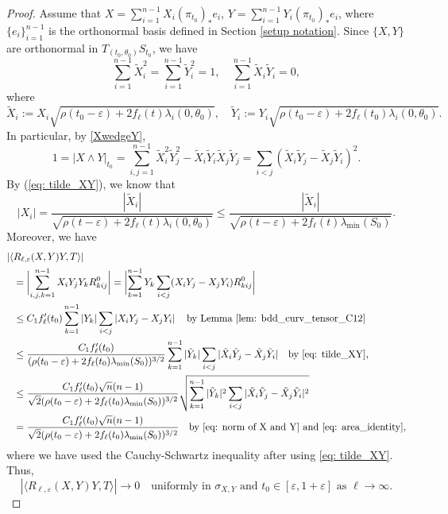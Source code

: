 \documentclass[JEP,XML,SOM,Unicode,NoFloatCountersInSection]{cedram}
\theoremstyle{definition}
\let\eps\varepsilon
\renewcommand{\>}{{\rangle}}
\newcommand{\<}{{\langle}}
\begin{document}
\begin{proof}
Assume that
$X=\sum_{i=1}^{n-1}X_i(\pi_{t_0})_*e_i$, $Y=\sum_{i=1}^{n-1}Y_i(\pi_{t_0})_*e_i$, where $\{e_i\}_{i=1}^{n-1}$ is the orthonormal basis defined in Section \ref{setup notation}. Since $\{X,Y\}$ are orthonormal in $T_{(t_0,\theta_0)}S_{t_0}$, we have
\begin{equation}\label{eq: norm of X and Y}
\sum_{i=1}^{n-1}\tilde{X}_i^2=\sum_{i=1}^{n-1}\tilde{Y}_i^2=1, \quad \sum_{i=1}^{n-1}\tilde{X}_i\tilde{Y}_i=0,
\end{equation}
where
\begin{equation}\label{eq: tilde_XY}
\tilde{X}_i:=X_i\sqrt{\rho(t_0-\eps)+2f_\ell(t)\lambda_i(0,\theta_0)},\quad  \tilde{Y}_i:=Y_i\sqrt{\rho(t_0-\eps)+2f_\ell(t_0)\lambda_i(0,\theta_0)}.
\end{equation}
In particular, by \eqref{XwedgeY},
\begin{equation}\label{eq: area_identity}
1=|X\wedge Y|_{t_0}=\sum_{i,j=1}^{n-1}\tilde{X}_i^2\tilde{Y}_j^2-\tilde{X}_i\tilde{Y}_i\tilde{X}_j\tilde{Y}_j=\sum_{i<j}(\tilde{X}_i \tilde{Y}_j-\tilde{X}_j\tilde{Y}_i)^2.
\end{equation}
By (\ref{eq: tilde_XY}), we know that
\[
|X_i|=\frac{|\tilde{X}_i|}{\sqrt{\rho(t-\eps)+2f_\ell(t)\lambda_i(0,\theta_0)}}\leq \frac{|\tilde{X}_i|}{\sqrt{\rho(t-\eps)+2f_\ell(t)\lambda_{\min}(S_0)}}.
\]
Moreover, we have
\begin{align}
|\langle &R_{\ell,\eps}(X,Y)Y,T\rangle|\label{eq: mixed term bound}
\\&=\biggl|\sum_{i,j,k=1}^{n-1}X_iY_jY_k R^0_{kij}\biggr|=\biggl|\sum_{k=1}^{n-1}Y_k\sum_{i<j}(X_iY_j-X_jY_i)R^0_{kij}\biggr|\nonumber
\\&\leq C_1f'_\ell(t_0)\sum_{k=1}^{n-1}|Y_k|\sum_{i<j}\left|X_iY_j-X_jY_i\right|\quad \text{by Lemma~\ref{lem: bdd_curv_tensor_C12}}\nonumber
\\&\leq \frac{C_1f'_\ell(t_0)}{(\rho(t_0-\eps)+2f_\ell(t_0)\lambda_{\min}(S_0))^{3/2}}\sum_{k=1}^{n-1} |\tilde{Y}_k|\sum_{i<j}|\tilde{X}_i \tilde{Y}_j-\tilde{X}_j\tilde{Y}_i| \quad \text{by \eqref{eq: tilde_XY}},\nonumber
\\&\leq \frac{C_1f'_\ell(t_0)\sqrt{n}(n-1)}{\sqrt{2}(\rho(t_0-\eps)+2f_\ell(t_0)\lambda_{\min}(S_0))^{3/2}}\sqrt{\sum_{k=1}^{n-1} |\tilde{Y}_k|^2\sum_{i<j}|\tilde{X}_i \tilde{Y}_j-\tilde{X}_j\tilde{Y}_i|^2}\nonumber
\\&= \frac{C_1f'_\ell(t_0)\sqrt{n}(n-1)}{\sqrt{2}(\rho(t_0-\eps)+2f_\ell(t_0)\lambda_{\min}(S_0))^{3/2}} \quad \text{by \eqref{eq: norm of X and Y} and \eqref{eq: area_identity}},\nonumber
\end{align}
where we have used the Cauchy-Schwartz inequality after using \eqref{eq: tilde_XY}.
Thus,
\begin{equation*}
|\langle R_{\ell,\eps}(X,Y)Y,T\rangle|\to 0 \quad\text{uniformly in } \sigma_{X,Y} \text{ and } t_0\in [\eps,1+\eps] \text{ as }\ell\to\infty.
\end{equation*}


\end{proof}
\end{document}
